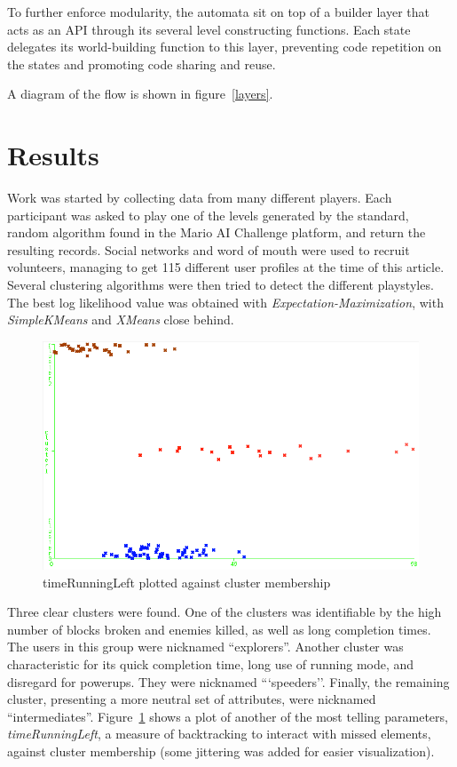 \documentclass[conference]{IEEEtran}
\begin{document}
To further enforce modularity, the automata sit on top of a builder layer that acts as an API through its several level constructing functions. Each state delegates its world-building function to this layer, preventing code repetition on the states and promoting code sharing and reuse.

A diagram of the flow is shown in figure~\ref{layers}.

\section{Results}

Work was started by collecting data from many different players. Each participant was asked to play one of the levels generated by the standard, random algorithm found in the Mario AI Challenge platform, and return the resulting records. Social networks and word of mouth were used to recruit volunteers, managing to get 115 different user profiles at the time of this article. Several clustering algorithms were then tried to detect the different playstyles. The best log likelihood value was obtained with \textit{Expectation-Maximization}, with \textit{SimpleKMeans} and \textit{XMeans} close behind. 

\begin{figure}[htp]
\centerline{\includegraphics[width=0.75\columnwidth]{timeRunningLeft_.png}}
\caption{timeRunningLeft plotted against cluster membership}
\label{wekaplot}
\end{figure}

Three clear clusters were found. One of the clusters was identifiable by the high number of blocks broken and enemies killed, as well as long completion times. The users in this group were nicknamed ``explorers''. Another cluster was characteristic for its quick completion time, long use of running mode, and disregard for powerups. They were nicknamed ```speeders''. Finally, the remaining cluster, presenting a more neutral set of attributes, were nicknamed ``intermediates''. Figure~\ref{wekaplot} shows a plot of another of the most telling parameters, \textit{timeRunningLeft}, a measure of backtracking to interact with missed elements, against cluster membership (some jittering was added for easier visualization).
\end{document}
